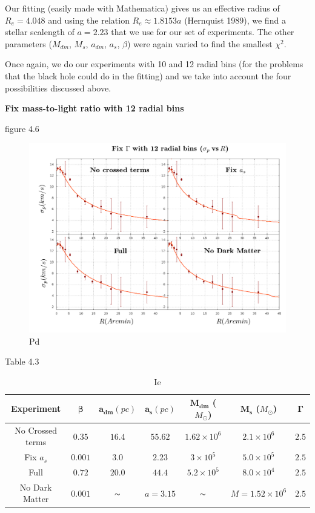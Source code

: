 Our fitting (easily made with Mathematica) gives us an effective radius of $R_{e}=4.048$ and using the relation $R_{e}\approx1.8153a$ (Hernquist 1989), we find a stellar scalength of $a=2.23$ that we use for our set of experiments. The other parameters ($M_{dm}$, $M_{s}$, $a_{dm}$, $a_{s}$, $\beta$) were again varied to find the smallest $\chi^{2}$.

Once again, we do our experiments with 10 and 12 radial bins (for the problems that the black hole could do in the fitting) and we take into account the four possibilities discussed above.

\textbf{Fix mass-to-light ratio with 12 radial bins}

figure 4.6

\begin{figure}[H]
\centering
\includegraphics[width=15cm]{images/fix_gamma_refinado_12.png}
\caption[Pg]{Pd}
\end{figure}

Table 4.3

\begin{table}[H]
\begin{center}
\begin{tabular}{| c| c| c| c| c| c| c|}
    \hline
    \textbf{Experiment} & $\mathbf{\beta}$ & $\mathbf{a_{dm}} (pc)$ & $\mathbf{a_{s}} (pc)$ & $\mathbf{M_{dm}}$ ($M_{\odot}$) & $\mathbf{M_{s}}$ ($M_{\odot}$) & $\mathbf{\Gamma}$\\ \hline
	No Crossed terms & $0.35$ &	$16.4$ &	$55.62$ &	$1.62 \times 10^{6}$ &	$2.1 \times 10^{6}$ &	$2.5$\\ \hline
	Fix $a_s$ &	$0.001$ &	$3.0$ &	$2.23$ &	$3 \times 10^{5}$ &	$5.0 \times 10 ^{5}$ &	$2.5$\\ \hline
	Full &	$0.72$ &	$20.0$ &	$44.4$ &	$5.2 \times 10^{5}$ &	$8.0 \times 10^{4}$ &	$2.5$\\ \hline
	No Dark Matter &	$0.001$ &	$\thicksim$ & $ a = 3.15$ &	$\thicksim$ & $  M = 1.52 \times 10^{6}$ & 	$2.5$\\
    \hline
  \end{tabular} 
\caption[It]{Ie}
\end{center}
  
\end{table}

